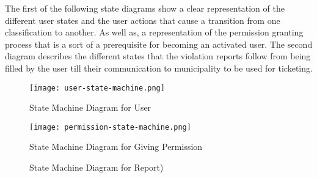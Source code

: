 The first of the following state diagrams show a clear representation of the different user states and the user actions that cause a transition from one classification to another. As well as, a representation of the permission granting process that is a sort of a prerequisite for becoming an activated user. The second diagram describes the different states that the violation reports follow from being filled by the user till their communication to municipality to be used for ticketing.


\begin{figure}[H]
\caption{State Machine Diagram for User}
\label{fig:ms-user}
\centering
\texttt{[image: user-state-machine.png]}
\end{figure}

\begin{figure}[H]
\caption{State Machine Diagram for Giving Permission}
\label{fig:ms-giving-permission}
\centering
\texttt{[image: permission-state-machine.png]}
\end{figure}

\begin{figure}[H]
\caption{State Machine Diagram for Report)}
\label{fig:MS-report-sm}
\centering

\end{figure}
